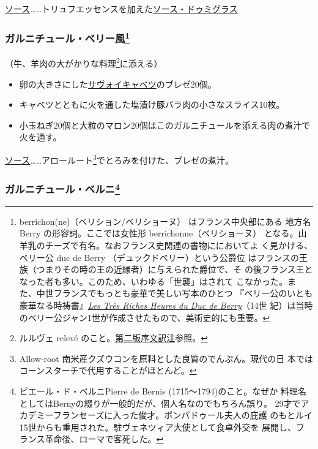 \begin{recette}
\ul{ソース}\ldots{}\ldots{}トリュフエッセンスを加えた\protect\hyperlink{sauce-demi-glace}{ソース・ドゥミグラス}

\hypertarget{garniture-berrichonne}{%
\subsubsection[ガルニチュール・ベリー風]{\texorpdfstring{ガルニチュール・ベリー風\footnote{berrichon(ne)（ベリション/ベリショーヌ）
  はフランス中央部にある 地方名 Berry の形容詞。ここでは女性形
  berrichonne（ベリショーヌ）
  となる。山羊乳のチーズで有名。なおフランス史関連の書物ににおいてよ
  く見かける、ベリー公 duc de Berry （デュックドベリー）という公爵位
  はフランスの王族（つまりその時の王の近縁者）に与えられた爵位で、そ
  の後フランス王となった者も多い。このため、いわゆる「世襲」はされて
  こなかった。また、中世フランスでもっとも豪華で美しい写本のひとつ
  『ベリー公のいとも豪華なる時祷書』\href{http://gallica.bnf.fr/ark:/12148/btv1b520004510}{\emph{Les
  Très Riches Heures du Duc de Berry}}（14世
  紀）は当時のベリー公ジャン1世が作成させたもので、美術史的にも重要。}}{ガルニチュール・ベリー風}}\label{garniture-berrichonne}}



（牛、羊肉の大がかりな料理\footnote{ルルヴェ relevé
  のこと。\protect\hyperlink{releve}{第二版序文訳注}参照。}に添える）

\begin{itemize}
\item
  卵の大きさにした\protect\hyperlink{chou-braise}{サヴォイキャベツ}のブレゼ20個。
\item
  キャベツとともに火を通した塩漬け豚バラ肉の小さなスライス10枚。
\item
  小玉ねぎ20個と大粒のマロン20個はこのガルニチュールを添える肉の煮汁で火を通す。
\end{itemize}

\ul{ソース}\ldots{}\ldots{}アロールート\footnote{Allow-root
  南米産クズウコンを原料とした良質のでんぷん。現代の日
  本ではコーンスターチで代用することがほとんど。}でとろみを付けた、ブレゼの煮汁。

\hypertarget{garniture-berny}{%
\subsubsection[ガルニチュール・ベルニ]{\texorpdfstring{ガルニチュール・ベルニ\footnote{ピエール・ド・ベルニPierre
  de Bernis (1715〜1794)のこと。なぜか
  料理名としてはBernyの綴りが一般的だが、個人名なのでもちろん誤り。
  29才でアカデミーフランセーズに入った俊才。ポンパドゥール夫人の庇護
  のもとルイ15世からも重用された。駐ヴェネツィア大使として食卓外交を
  展開し、フランス革命後、ローマで客死した。}}{ガルニチュール・ベルニ}}\label{garniture-berny}}


\end{recette}
